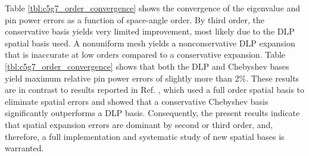 Table \ref{tbl:c5g7_order_convergence} shows the convergence of 
the eigenvalue and pin power errors as a function of space-angle 
order.  By third order, the conservative basis yields
very limited improvement, most likely due to the DLP 
spatial basis used.  A nonuniform mesh yields a nonconservative
DLP expansion that is inaccurate at low orders compared to a
conservative expansion.
Table \ref{tbl:c5g7_order_convergence} shows that both the
DLP and Chebyshev bases yield
maximum relative pin power errors of slightly more than 2\%.
These results are in contrast to results reported in 
Ref. \cite{roberts2014psb}, 
which used a full order spatial basis to eliminate spatial errors and
showed that a conservative Chebyshev basis significantly outperforms a
DLP basis.
Consequently, the present results indicate that
spatial expansion errors are dominant by second or third order,
and, therefore, a full 
implementation and systematic study of new spatial bases 
is warranted.

